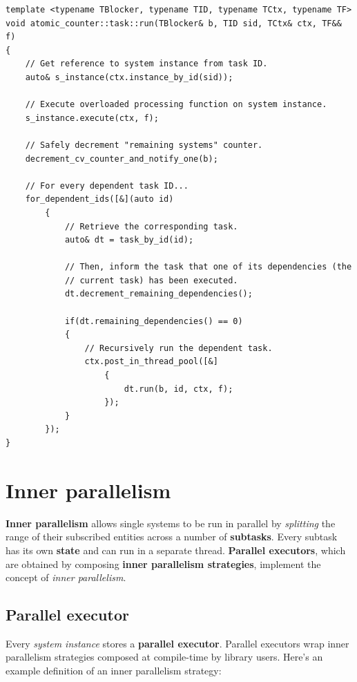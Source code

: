 \documentclass[twoside, 12pt, a4paper, openany]{book}
\begin{document}
\begin{verbatim}
template <typename TBlocker, typename TID, typename TCtx, typename TF>
void atomic_counter::task::run(TBlocker& b, TID sid, TCtx& ctx, TF&& f)
{
    // Get reference to system instance from task ID.
    auto& s_instance(ctx.instance_by_id(sid));

    // Execute overloaded processing function on system instance.
    s_instance.execute(ctx, f);

    // Safely decrement "remaining systems" counter.
    decrement_cv_counter_and_notify_one(b);

    // For every dependent task ID...
    for_dependent_ids([&](auto id)
        {
            // Retrieve the corresponding task.
            auto& dt = task_by_id(id);

            // Then, inform the task that one of its dependencies (the
            // current task) has been executed.
            dt.decrement_remaining_dependencies();

            if(dt.remaining_dependencies() == 0)
            {
                // Recursively run the dependent task.
                ctx.post_in_thread_pool([&]
                    {
                        dt.run(b, id, ctx, f);
                    });
            }
        });
}
\end{verbatim}

\hypertarget{multithreading_inner_par}{\section{Inner
parallelism}\label{multithreading_inner_par}}

\textbf{Inner parallelism} allows single systems to be run in parallel
by \emph{splitting} the range of their subscribed entities across a
number of \textbf{subtasks}. Every subtask has its own \textbf{state}
and can run in a separate thread. \textbf{Parallel executors}, which are
obtained by composing \textbf{inner parallelism strategies}, implement
the concept of \emph{inner parallelism}.

\hypertarget{multithreading_par_executor}{\subsection{Parallel
executor}\label{multithreading_par_executor}}

Every \emph{system instance} stores a \textbf{parallel executor}.
Parallel executors wrap inner parallelism strategies composed at
compile-time by library users. Here's an example definition of an inner
parallelism strategy:
\end{document}
